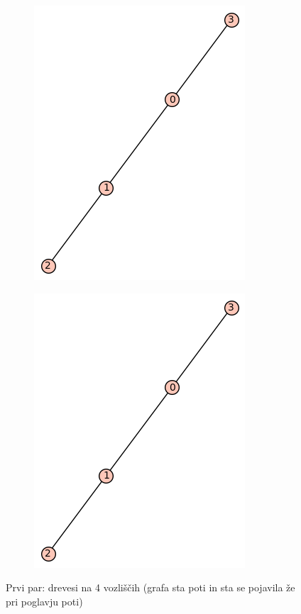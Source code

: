 \documentclass[12pt, a4paper]{article}
\begin{document}
\begin{center}
\begin{figure}[!htb]
\centering
\begin{subfigure}{0.5\textwidth}
  \centering
  \includegraphics[width=0.35\linewidth]{t-3}
\end{subfigure}%
\begin{subfigure}{0.5\textwidth}
  \centering
  \includegraphics[width=0.35\linewidth]{t-3}
\end{subfigure}
\caption{Prvi par: drevesi na 4 vozliščih (grafa sta poti in sta se pojavila že pri poglavju poti)}
\label{fig:test}
\end{figure}
\end{center}
\end{document}
